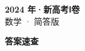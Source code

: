 \documentclass[zihao=-4, a4paper]{ctexart}
\begin{document}
\begin{center}
  {\Large\bfseries 2024 年·新高考Ⅰ卷}\\[4pt]
  {\large 数学 · 简答版}
\end{center}
\medskip
{}

\clearpage
{}
\begin{center}{\Large\bfseries 答案速查}\end{center}
\medskip

\end{document}
